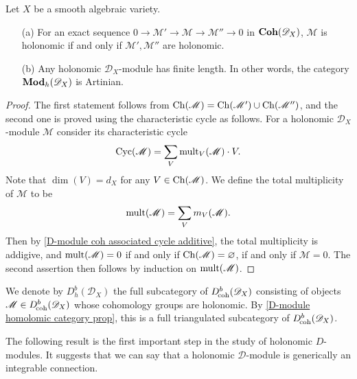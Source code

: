 \begin{proposition}\label{D-module homolomic category prop}
Let $X$ be a smooth algebraic variety.
\begin{enumerate}
    \item[(a)] For an exact sequence $0\to\mathscr{M}'\to\mathscr{M}\to\mathscr{M}''\to 0$ in $\mathbf{Coh}(\mathscr{D}_X)$, $\mathscr{M}$ is holonomic if and only if $\mathscr{M}',\mathscr{M}''$ are holonomic.
    \item[(b)] Any holonomic $\mathscr{D}_X$-module has finite length. In other words, the category $\mathbf{Mod}_h(\mathscr{D}_X)$ is Artinian.
\end{enumerate}
\end{proposition}
\begin{proof}
The first statement follows from $\mathrm{Ch}(\mathscr{M})=\mathrm{Ch}(\mathscr{M}')\cup\mathrm{Ch}(\mathscr{M}'')$, and the second one is proved using the characteristic cycle as follows. For a holonomic $\mathscr{D}_X$-module $\mathscr{M}$ consider its characteristic cycle
\[\mathrm{Cyc}(\mathscr{M})=\sum_V\mathrm{mult}_V(\mathscr{M})\cdot V.\]
Note that $\dim(V)=d_X$ for any $V\in\mathrm{Ch}(\mathscr{M})$. We define the total multiplicity of $\mathscr{M}$ to be
\[\mathrm{mult}(\mathscr{M})=\sum_Vm_V(\mathscr{M}).\]
Then by \cref{D-module coh associated cycle additive}, the total multiplicity is addigive, and $\mathrm{mult}(\mathscr{M})=0$ if and only if $\mathrm{Ch}(\mathscr{M})=\varnothing$, if and only if $\mathscr{M}=0$. The second assertion then follows by induction on $\mathrm{mult}(\mathscr{M})$.
\end{proof}

We denote by $D_h^b(\mathscr{D}_X)$ the full subcategory of $D^b_{\!\mathrm{coh}}(\mathscr{D}_X)$ consisting of objects $\mathscr{M}\in D^b_{\!\mathrm{coh}}(\mathscr{D}_X)$ whose cohomology groups are holonomic. By \cref{D-module homolomic category prop}, this is a full triangulated subcategory of $D^b_{\!\mathrm{coh}}(\mathscr{D}_X)$.\par
The following result is the first important step in the study of holonomic $D$-modules. It suggests that we can say that a holonomic $\mathscr{D}$-module is generically an integrable connection.

